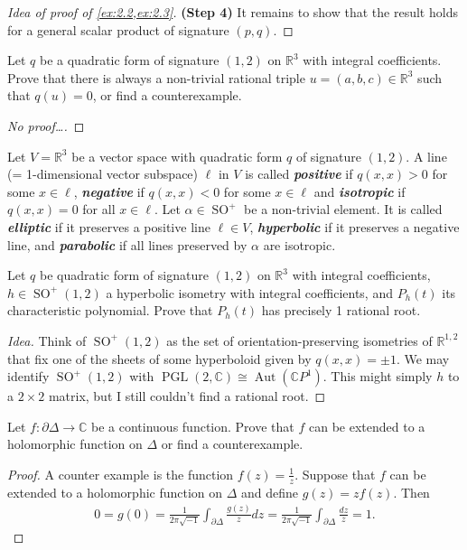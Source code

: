 \documentclass{article}
\numberwithin{equation}{section}
\newcommand{\R}{\mathbb{R}}
\newcommand{\C}{\mathbb{C}}
\DeclareMathOperator{\SO}{SO}
\DeclareMathOperator{\Aut}{Aut}
\DeclareMathOperator{\PGL}{PGL}
\begin{document}
\begin{proof}[Idea of proof of \cref{ex:2.2,ex:2.3}]
		\textbf{(Step 4)} It remains to show that the result holds for a general scalar product of signature $(p,q)$.
		
	\end{proof}
	
	\begin{exercise}
		Let $q$ be a quadratic form of signature $(1,2)$ on $\R^3$ with integral coefficients. Prove that there is always a non-trivial rational triple $u=(a,b,c)\in\R^3$ such that $q(u)=0$, or find a counterexample.
	\end{exercise}
	\begin{proof}[No proof…]
	\end{proof}
	\begin{defn}
		Let $V=\R^3$ be a vector space with quadratic form $q$ of signature $(1,2)$. A line (= 1-dimensional vector subspace) $\ell$ in $V$ is called \textbf{\textit{positive}} if $q(x,x)>0$ for some $x\in\ell$, \textbf{\textit{negative}} if $q(x,x)<0$ for some $x\in\ell$ and \textbf{\textit{isotropic}} if $q(x,x)=0$ for all $x\in\ell$. Let $\alpha\in\SO^+$ be a non-trivial element. It is called \textbf{\textit{elliptic}} if it preserves a positive line $\ell\in V$, \textbf{\textit{hyperbolic}} if it preserves a negative line, and \textbf{\textit{parabolic}} if all lines preserved by $\alpha$ are isotropic.
	\end{defn}
	
	\begin{exercise}
		Let $q$ be quadratic form of signature $(1,2)$ on $\R^3$ with integral coefficients, $h\in\SO^+(1,2)$ a hyperbolic isometry with integral coefficients, and $P_h(t)$ its characteristic polynomial. Prove that $P_h(t)$ has precisely 1 rational root.
	\end{exercise}
	\begin{proof}[Idea]
		Think of $\SO^+(1,2)$ as the set of orientation-preserving isometries of $\R^{1,2}$ that fix one of the sheets of some hyperboloid given by $q(x,x)=\pm1$. We may identify $\SO^+(1,2)$ with $\PGL(2,\C)\cong\Aut(\C P^1)$. {\color{magenta} This might simply $h$ to a $2\times 2$ matrix, but I still couldn't find a rational root.}
	\end{proof}
	\begin{exercise}
		Let $f:\partial\Delta\to\C$ be a continuous function. Prove that $f$ can be extended to a holomorphic function on $\Delta$ or find a counterexample.
	\end{exercise}
	\begin{proof}
		A counter example is the function $f(z)=\frac{1}{z}$. Suppose that $f$ can be extended to a holomorphic function on $\Delta$ and define $g(z)=zf(z)$. Then
		\begin{align*}
			0=g(0)=\frac{1}{2\pi\sqrt{-1}}\int_{\partial\Delta}\frac{g(z)}{z}dz=\frac{1}{2\pi \sqrt{-1}}\int_{\partial\Delta}\frac{dz}{z}=1.
		\end{align*}
		
	\end{proof}
	
	
\end{document}
